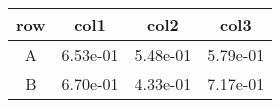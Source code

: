 \begin{tabular}{cccc}
\toprule
row&col1&col2&col3\tabularnewline
\midrule
A&6.53e-01&5.48e-01&5.79e-01\tabularnewline
B&6.70e-01&4.33e-01&7.17e-01\tabularnewline
\bottomrule
\end{tabular}
